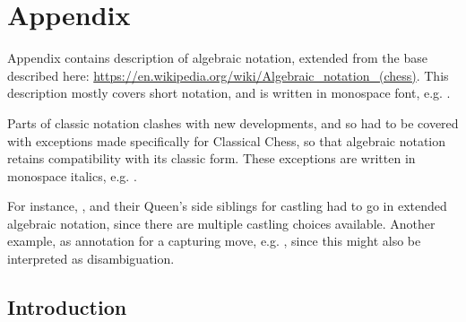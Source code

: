 

\chapter*{Appendix}
\label{ch:Appendix}

Appendix contains description of algebraic notation, extended from the base described here:\newline
\href{https://en.wikipedia.org/wiki/Algebraic\_notation\_(chess)}{https://en.wikipedia.org/wiki/Algebraic\_notation\_(chess)}.\newline
This description mostly covers short notation, and is written in monospace font, e.g. .

Parts of classic notation clashes with new developments, and so had to be covered with
exceptions made specifically for Classical Chess, so that algebraic notation retains
compatibility with its classic form. These exceptions are written in monospace italics,
e.g. .

For instance, ,  and their Queen's side siblings for castling had
to go in extended algebraic notation, since there are multiple castling choices available.
Another example,  as annotation for a capturing move, e.g. , since
this might also be interpreted as disambiguation.

\clearpage %

\section*{Introduction}
\label{sec:Appendix/Introduction}

